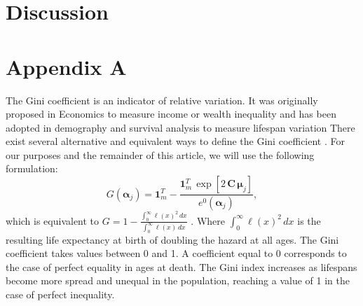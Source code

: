 \documentclass[12pt,a4paper,twoside]{article}
\begin{document}
\section{Discussion}



\section*{Appendix A}

The Gini coefficient is an indicator of relative variation. It was originally proposed in Economics to measure income or wealth inequality and  has been adopted in demography and survival analysis to measure lifespan variation \citep{Hanada1983,Shkolnikov2003,bonetti2009gini,gigliarano2017longevity} There exist several alternative and equivalent ways to define the Gini coefficient \citep{yitzhaki2013gini}. For our purposes and the remainder of this article, we will use the following formulation: 
%
\begin{equation}\label{eq:G}
G(\bm{\alpha}_{j}) = \bm{1}_{m}^{T} - \frac{ \bm{1}_{m}^{T} \, \exp[ 2\, \bm{C} \, \bm{\mu}_{j}] }{e^{0} (\bm{\alpha}_{j})}, 
\end{equation}
%
which is equivalent to $G = 1-\frac{\int_0^\infty\ell(x)^2\,dx}{\int_0^\infty\ell(x)\,dx}$ \citep{michettid1957,Hanada1983}.
Where $\int_0^\infty \ell(x)^2\,dx$ is the resulting life expectancy at birth of doubling the hazard at all ages. The Gini coefficient takes values between 0 and 1. A coefficient equal to 0 corresponds to the case of perfect equality in ages at death. The Gini index increases as lifespans become more spread and unequal in the population, reaching a value of 1 in the case of perfect inequality.



\linespread{1}\normalsize

\small



\end{document}
